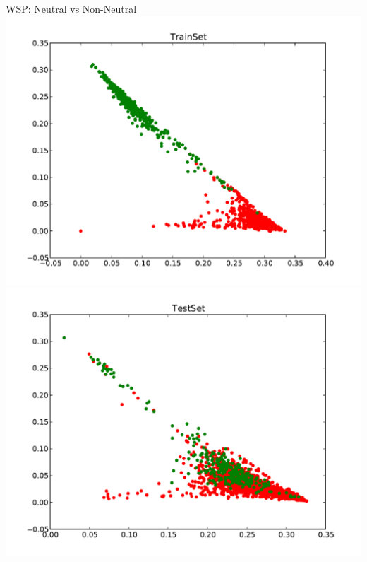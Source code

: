 \documentclass{beamer}
\begin{document}
\begin{frame}{WSP: Neutral vs Non-Neutral}
\centering
\includegraphics[scale=0.25]{NeuNonNeuScatter1.pdf}
\includegraphics[scale=0.25]{NeuNonNeuScatter2.pdf}
\end{frame}
\end{document}
